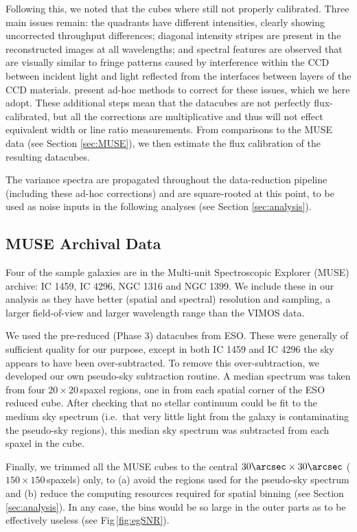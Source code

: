 \documentclass[fleqn,usenatbib,useAMS]{mnras}
\begin{document}
	Following this, we noted that the cubes where still not properly calibrated. Three main issues remain: the quadrants have different intensities, clearly showing uncorrected throughput differences; diagonal intensity stripes are present in the reconstructed images at all wavelengths; and spectral features are observed \citep{Jullo2008} that are visually similar to fringe patterns caused by interference within the CCD between incident light and light reflected from the interfaces between layers of the CCD materials. \citet{Lagerholm2012} present ad-hoc methods to correct for these issues, which we here adopt. These additional steps mean that the datacubes are not perfectly flux-calibrated, but all the corrections are multiplicative and thus will not effect equivalent width or line ratio measurements. From comparisons to the MUSE data (see Section \ref{sec:MUSE}), we then estimate the flux calibration of the resulting datacubes. 

	The variance spectra are propagated throughout the data-reduction pipeline (including these ad-hoc corrections) and are square-rooted at this point, to be used as noise inputs in the following analyses (see Section \ref{sec:analysis}).


	\subsection{MUSE Archival Data}
		\label{subsec:MUSE}
		Four of the sample galaxies are in the Multi-unit Spectroscopic Explorer (MUSE) archive: IC 1459, IC 4296, NGC 1316 and NGC 1399. We include these in our analysis as they have better (spatial and spectral) resolution and sampling, a larger field-of-view and larger wavelength range than the VIMOS data. 

		We used the pre-reduced (Phase 3) datacubes from ESO. These were generally of sufficient quality for our purpose, except in both IC 1459 and IC 4296 the sky appears to have been over-subtracted. To remove this over-subtraction, we developed our own pseudo-sky subtraction routine. A median spectrum was taken from four $20 \times 20$\,spaxel regions, one in from each spatial corner of the ESO reduced cube. After checking that no stellar continuum could be fit to the medium sky spectrum (i.e.\ that very little light from the galaxy is contaminating the pseudo-sky regions), this median sky spectrum was subtracted from each spaxel in the cube. 

		Finally, we trimmed all the MUSE cubes to the central $30\arcsec \times 30\arcsec$ ($150 \times 150$\,spaxels) only, to (a) avoid the regions used for the pseudo-sky spectrum and (b) reduce the computing resources required for spatial binning (see Section \ref{sec:analysis}). In any case, the bins would be so large in the outer parts as to be effectively useless (see Fig\,\ref{fig:egSNR}).
\end{document}
